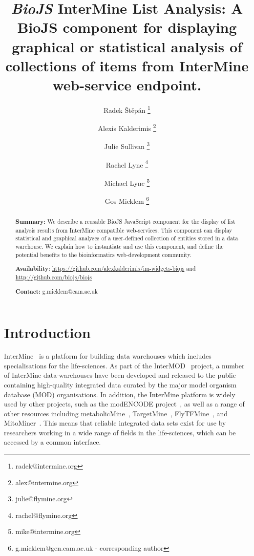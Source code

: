 \documentclass[10pt,a4paper,twocolumn]{article}
\begin{document}
\title{\textit{BioJS} InterMine List Analysis:
A BioJS component for displaying graphical or statistical analysis of
collections of items from InterMine web-service endpoint.
}

\author[1]{Radek Štěpán \thanks{radek@intermine.org}}
\author[1]{Alexis Kalderimis \thanks{alex@intermine.org}}
\author[1]{Julie Sullivan \thanks{julie@flymine.org}}
\author[1]{Rachel Lyne \thanks{rachel@flymine.org}}
\author[1]{Michael Lyne \thanks{mike@intermine.org}}
\author[1]{Gos Micklem \thanks{g.micklem@gen.cam.ac.uk - corresponding author}}

\maketitle
\thispagestyle{fancy}

\begin{abstract}

\textbf{Summary:}
We describe a reusable BioJS JavaScript component for the display of list
analysis results from InterMine compatible web-services. This component can display
statistical and graphical analyses of a user-defined collection of entities stored
in a data warehouse. We explain how to instantiate and use this component, and
define the potential benefits to the bioinformatics web-development community.

\textbf{Availability:}
\url{https://github.com/alexkalderimis/im-widgets-biojs} and
\url{http://github.com/biojs/biojs}

\textbf{Contact:} g.micklem@cam.ac.uk

\end{abstract}
\clearpage

\section*{Introduction}

InterMine~\cite{intermine} is a platform for building data warehouses which
includes specialisations for the life-sciences. As part of the
InterMOD~\cite{intermod} project, a number of InterMine data-warehouses have
been developed and released to the public containing high-quality integrated
data curated by the major model organism database (MOD) organisations. In
addition, the InterMine platform is widely used by other projects, such as the
modENCODE project~\cite{contrino2012}, as well as a range of other resources
including metabolicMine~\cite{metabolicmine}, TargetMine~\cite{targetmine},
FlyTFMine~\cite{flytfmine}, and MitoMiner~\cite{mitominer}. This means that
reliable integrated data sets exist for use by researchers working in a wide
range of fields in the life-sciences, which can be accessed by a common
interface.
\end{document}
